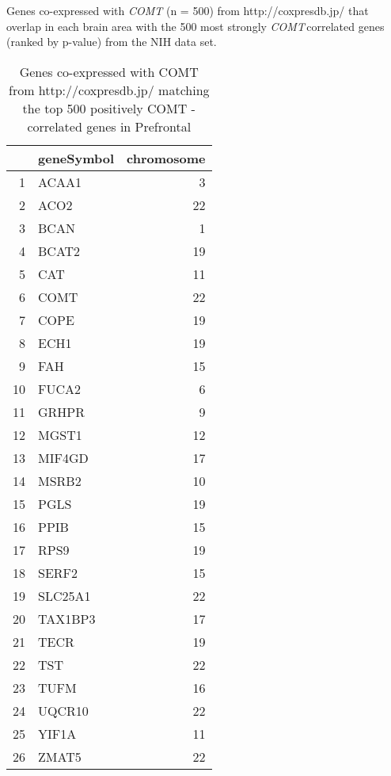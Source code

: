 \documentclass[letterpaper,12pt]{article}
\newcommand{\den}{\hspace{2pt}\textendash \,}
\numberwithin{equation}{appendix}
\begin{document}
\noindent

Genes co-expressed with {\textit {COMT}} (n = 500) from http://coxpresdb.jp/ that overlap in each brain area with the 500 most strongly {\textit {COMT}}\den correlated genes (ranked by p-value) from the NIH data set.\\

{\small {
\begin{table}[ht]
\centering
\begin{tabular}{rlr}
  \hline
 & geneSymbol & chromosome \\ 
  \hline
1 & ACAA1 &   3 \\ 
  2 & ACO2 &  22 \\ 
  3 & BCAN &   1 \\ 
  4 & BCAT2 &  19 \\ 
  5 & CAT &  11 \\ 
  6 & COMT &  22 \\ 
  7 & COPE &  19 \\ 
  8 & ECH1 &  19 \\ 
  9 & FAH &  15 \\ 
  10 & FUCA2 &   6 \\ 
  11 & GRHPR &   9 \\ 
  12 & MGST1 &  12 \\ 
  13 & MIF4GD &  17 \\ 
  14 & MSRB2 &  10 \\ 
  15 & PGLS &  19 \\ 
  16 & PPIB &  15 \\ 
  17 & RPS9 &  19 \\ 
  18 & SERF2 &  15 \\ 
  19 & SLC25A1 &  22 \\ 
  20 & TAX1BP3 &  17 \\ 
  21 & TECR &  19 \\ 
  22 & TST &  22 \\ 
  23 & TUFM &  16 \\ 
  24 & UQCR10 &  22 \\ 
  25 & YIF1A &  11 \\ 
  26 & ZMAT5 &  22 \\ 
   \hline
\end{tabular}
\caption{Genes co-expressed with COMT from http://coxpresdb.jp/ matching the top 500 positively COMT - correlated genes in Prefrontal} 
\end{table}

}}
\end{document}
